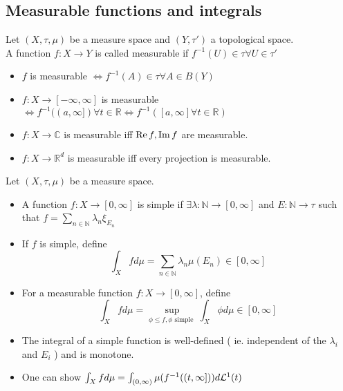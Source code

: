 \documentclass[../main.tex]{subfiles}
\begin{document}
\subsection{Measurable functions and integrals}
\begin{defn}
	Let $( X,\tau,\mu) $ be a measure space and $( Y,\tau') $ a topological space.\\
	A function $f:X\to Y$ is called measurable if $f^{-1}( U) \in \tau\forall U\in \tau'$
\end{defn}
\begin{rmq}
\begin{itemize}
\item $f$ is measurable $\iff f^{-1}( A) \in \tau\forall A \in B( Y) $ 
\item $f:X\to [ - \infty , \infty ] $ is measurable $\iff f^{-1}( ( a, \infty ] ) \forall t \in \mathbb{R} \iff f^{-1}( [ a, \infty ] \forall t \in \mathbb{R}) $ 
\item $f:X\to \mathbb{C}$ is measurable iff $\operatorname{Re} f,\operatorname{Im} f$ are measurable.
\item $f:X\to \mathbb{R}^{d}$ is measurable iff every projection is measurable.
\end{itemize}
\end{rmq}
\begin{defn}[Integral]
	Let $( X,\tau,\mu) $ be a measure space.\\
	\begin{itemize}
	\item A function $f:X\to [ 0, \infty ] $ is simple if $\exists \lambda: \mathbb{N}\to [ 0, \infty ] $ and $E: \mathbb{N}\to \tau$ such that $f= \sum_{n\in \mathbb{N}}^{ } \lambda_n \xi_{E_n} $ 
	\item If $f$ is simple, define
		\[ 
		\int_X f d\mu = \sum_{n\in \mathbb{N}}^{ }\lambda_n \mu( E_n) \in [ 0, \infty ] 
		\]
		
	\item For a measurable function $f:X\to [ 0, \infty ]$, define
		\[ 
		\int_{ X }^{  } f d\mu = \sup_{\phi \leq f, \phi \text{ simple } } \int_{ X }^{  }\phi d\mu \in [ 0, \infty ] 
		\]
	\end{itemize}
\end{defn}
\begin{rmq}
\begin{itemize}
\item The integral of a simple function is well-defined ( ie. independent of the $\lambda_i$ and $E_i$ ) and is monotone.
\item One can show $ \int_{ X }^{  }f d\mu = \int_{ ( 0, \infty )  }^{  } \mu( f^{-1}( ( t, \infty ]  ) ) d \mathcal{L}^{1}( t)$
\end{itemize}
\end{rmq}
\end{document}
